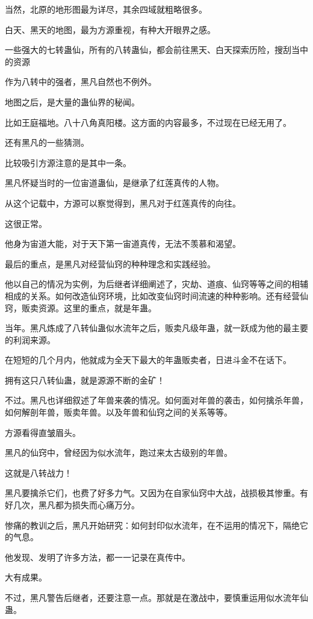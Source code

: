\begin{this_body}
当然，北原的地形图最为详尽，其余四域就粗略很多。

白天、黑天的地图，最为方源重视，有种大开眼界之感。

一些强大的七转蛊仙，所有的八转蛊仙，都会前往黑天、白天探索历险，搜刮当中的资源

作为八转中的强者，黑凡自然也不例外。

地图之后，是大量的蛊仙界的秘闻。

比如王庭福地。八十八角真阳楼。这方面的内容最多，不过现在已经无用了。

还有黑凡的一些猜测。

比较吸引方源注意的是其中一条。

黑凡怀疑当时的一位宙道蛊仙，是继承了红莲真传的人物。

从这个记载中，方源可以察觉得到，黑凡对于红莲真传的向往。

这很正常。

他身为宙道大能，对于天下第一宙道真传，无法不羡慕和渴望。

最后的重点，是黑凡对经营仙窍的种种理念和实践经验。

他以自己的情况为实例，为后继者详细阐述了，灾劫、道痕、仙窍等等之间的相辅相成的关系。如何改造仙窍环境，比如改变仙窍时间流速的种种影响。还有经营仙窍，贩卖资源。这里的重点，就是年蛊。

当年。黑凡炼成了八转仙蛊似水流年之后，贩卖凡级年蛊，就一跃成为他的最主要的利润来源。

在短短的几个月内，他就成为全天下最大的年蛊贩卖者，日进斗金不在话下。

拥有这只八转仙蛊，就是源源不断的金矿！

不过。黑凡也详细叙述了年兽来袭的情况。如何面对年兽的袭击，如何擒杀年兽，如何解剖年兽，贩卖年兽。以及年兽和仙窍之间的关系等等。

方源看得直皱眉头。

黑凡的仙窍中，曾经因为似水流年，跑过来太古级别的年兽。

这就是八转战力！

黑凡要擒杀它们，也费了好多力气。又因为在自家仙窍中大战，战损极其惨重。有好几次，黑凡都为损失而心痛万分。

惨痛的教训之后，黑凡开始研究：如何封印似水流年，在不运用的情况下，隔绝它的气息。

他发现、发明了许多方法，都一一记录在真传中。

大有成果。

不过，黑凡警告后继者，还要注意一点。那就是在激战中，要慎重运用似水流年仙蛊。


\end{this_body}
